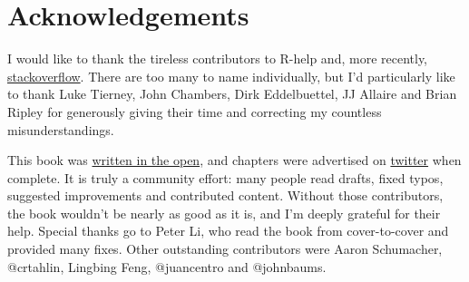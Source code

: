 \section{Acknowledgements}\label{intro-ack}

I would like to thank the tireless contributors to R-help and, more
recently,
\href{http://stackoverflow.com/questions/tagged/r}{stackoverflow}. There
are too many to name individually, but I'd particularly like to thank
Luke Tierney, John Chambers, Dirk Eddelbuettel, JJ Allaire and Brian
Ripley for generously giving their time and correcting my countless
misunderstandings.

This book was \href{https://github.com/hadley/adv-r/}{written in the
open}, and chapters were advertised on
\href{https://twitter.com/hadleywickham}{twitter} when complete. It is
truly a community effort: many people read drafts, fixed typos,
suggested improvements and contributed content. Without those
contributors, the book wouldn't be nearly as good as it is, and I'm
deeply grateful for their help. Special thanks go to Peter Li, who read
the book from cover-to-cover and provided many fixes. Other outstanding
contributors were Aaron Schumacher, @crtahlin, Lingbing Feng,
@juancentro and @johnbaums.

